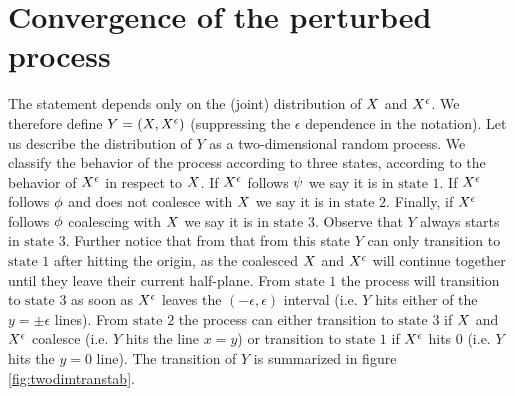 {
\newpage

\section{Convergence of the perturbed process}
\label{sec:proof-of-lem:resamplede-to-sampled}

\newcommand{\bandwidth}{\delta}
\newcommand{\rotproc}{Y^\circ}
\newcommand{\union}{\cup}
\renewcommand{\L}{L^+ \union L^-}
\newcommand{\Le}{L^\epsilon}
\newcommand{\statenoweb}{\text{state }1}
\newcommand{\statewebapart}{\text{state }2}
\newcommand{\statewebtogether}{\text{state }3}
\newcommand{\twodim}{Y}

The statement
\statementoflemresampledetosampled{} depends only on the
(joint) distribution of $X$ and $X^{\epsilon}$. We therefore define $\twodim=(\sampled, \resamplede)$ (suppressing the $\epsilon$ dependence in the notation). Let us describe the distribution of $\twodim$
 as a two-dimensional random process.
We classify the behavior of the process according to three states, according to
the behavior of $X^{\epsilon}$ in respect to $X$. If $X^{\epsilon}$ follows
$\psi$ we say it is in $\statenoweb$. If $X^{\epsilon}$ follows $\phi$
and does not coalesce with $X$ we say it is in $\statewebapart$. Finally,
if $X^{\epsilon}$ follows $\phi$ coalescing with $X$ we say it is in
$\statewebtogether$.  Observe that $\twodim$ always starts
in $\statewebtogether$. Further notice that from that from this state $\twodim$
can only transition to $\statenoweb$ after hitting the origin, as the coalesced
$X$ and $X^{\epsilon}$ will continue together until they leave their
current half-plane. From $\statenoweb$ the process will transition to
$\statewebtogether$ as soon as $X^{\epsilon}$ leaves the $(-\epsilon,\epsilon)$
interval (i.e. $\twodim$ hits either of the $y=\pm\epsilon$ lines). From
$\statewebapart$ the process can either transition to $\statewebtogether$
if $X$ and $X^{\epsilon}$ coalesce (i.e. $\twodim$ hits the line $x=y$)
or transition to $\statenoweb$ if $X^{\epsilon}$ hits $0$ (i.e. $\twodim$ hits
the $y=0$ line). The transition of $\twodim$ is summarized in figure
\ref{fig:twodimtranstab}.

}
